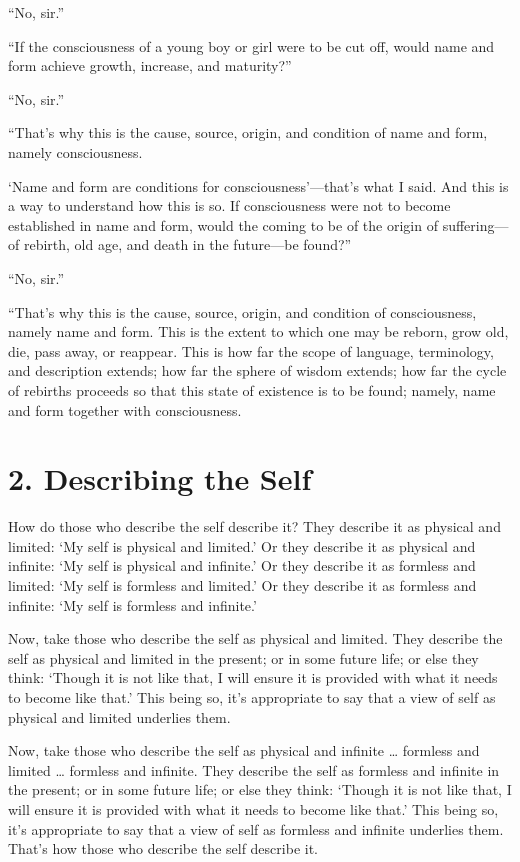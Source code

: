\documentclass[12pt,openany]{book}%
\begin{document}
“No, sir.” 

“If the consciousness of a young boy or girl were to be cut off, would name and form achieve growth, increase, and maturity?” 

“No, sir.” 

“That’s why this is the cause, source, origin, and condition of name and form, namely consciousness. 

‘Name and form are conditions for consciousness’—that’s what I said. And this is a way to understand how this is so. If consciousness were not to become established in name and form, would the coming to be of the origin of suffering—of rebirth, old age, and death in the future—be found?” 

“No, sir.” 

“That’s why this is the cause, source, origin, and condition of consciousness, namely name and form. This is the extent to which one may be reborn, grow old, die, pass away, or reappear. This is how far the scope of language, terminology, and description extends; how far the sphere of wisdom extends; how far the cycle of rebirths proceeds so that this state of existence is to be found; namely, name and form together with consciousness. 

\section*{2. Describing the Self }

How do those who describe the self describe it? They describe it as physical and limited: ‘My self is physical and limited.’ Or they describe it as physical and infinite: ‘My self is physical and infinite.’ Or they describe it as formless and limited: ‘My self is formless and limited.’ Or they describe it as formless and infinite: ‘My self is formless and infinite.’ 

Now, take those who describe the self as physical and limited. They describe the self as physical and limited in the present; or in some future life; or else they think: ‘Though it is not like that, I will ensure it is provided with what it needs to become like that.’ This being so, it’s appropriate to say that a view of self as physical and limited underlies them. 

Now, take those who describe the self as physical and infinite … formless and limited … formless and infinite. They describe the self as formless and infinite in the present; or in some future life; or else they think: ‘Though it is not like that, I will ensure it is provided with what it needs to become like that.’ This being so, it’s appropriate to say that a view of self as formless and infinite underlies them. That’s how those who describe the self describe it. 
\end{document}
